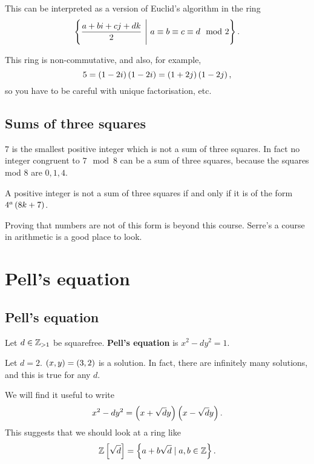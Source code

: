 \begin{remark}
This can be interpreted as a version of Euclid's algorithm in the ring
$$ \cb{\dfrac{a + bi + cj + dk}{2} \ \Bigg| \ a \equiv b \equiv c \equiv d \mod 2}. $$
\end{remark}

\begin{note*}
This ring is non-commutative, and also, for example,
$$ 5 = \left( 1 - 2i \right)\left( 1 - 2i \right) = \left( 1 + 2j \right)\left( 1 - 2j \right), $$
so you have to be careful with unique factorisation, etc.
\end{note*}

\subsection{Sums of three squares}

$ 7 $ is the smallest positive integer which is not a sum of three squares. In fact no integer congruent to $ 7 \mod 8 $ can be a sum of three squares, because the squares mod $ 8 $ are $ 0, 1, 4 $.

\begin{theorem}
A positive integer is not a sum of three squares if and only if it is of the form $ 4^a\left( 8k + 7 \right) $.
\end{theorem}

Proving that numbers are not of this form is beyond this course. Serre's a course in arithmetic is a good place to look.

\pagebreak

\section{Pell's equation}

\subsection{Pell's equation}

Let $ d \in \mathbb{Z}_{> 1} $ be squarefree. \textbf{Pell's equation} is $ x^2 - dy^2 = 1 $.

\begin{example*}
Let $ d = 2 $. $ \left( x, y \right) = \left( 3, 2 \right) $ is a solution. In fact, there are infinitely many solutions, and this is true for any $ d $.
\end{example*}

We will find it useful to write
$$ x^2 - dy^2 = \left( x + \sqrt{d}y \right)\left( x - \sqrt{d}y \right). $$
This suggests that we should look at a ring like
$$ \mathbb{Z}\left[ \sqrt{d} \right] = \left\{ a + b\sqrt{d} \mid a, b \in \mathbb{Z} \right\}. $$


